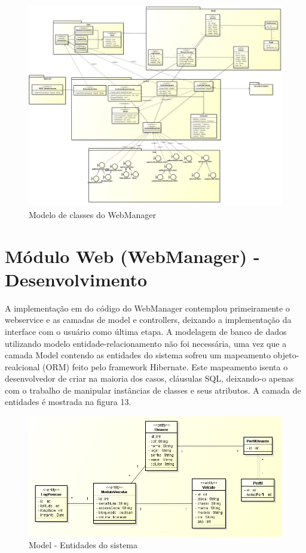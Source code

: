 \begin{landscape}

\begin{figure}[!htb]
	\centering
	\includegraphics[width=20.00cm\textwidth]{figures/6_web_manager.png}
	\caption{Modelo de classes do WebManager}
	\label{Figura 12}
\end{figure}
\end{landscape}

\section{Módulo Web (WebManager) - Desenvolvimento}
A implementação em do código do WebManager contemplou primeiramente o webservice e as camadas de model e controllers, deixando a implementação da interface com o usuário como última etapa. A modelagem de banco de dados utilizando modelo entidade-relacionamento não foi necessária, uma vez que a camada Model contendo as entidades do sistema sofreu um mapeamento objeto-realcional (ORM) feito pelo framework Hibernate. Este mapeamento isenta o desenvolvedor de criar na maioria dos casos, cláusulas SQL, deixando-o apenas com o trabalho de manipular instâncias de classes e seus atributos. A camada de entidades é mostrada na figura 13.

\begin{figure}[!htb]
	\centering
	\includegraphics[width=15.00cm\textwidth]{figures/model.png}
	\caption{Model - Entidades do sistema}
	\label{Figura 13}
\end{figure}

